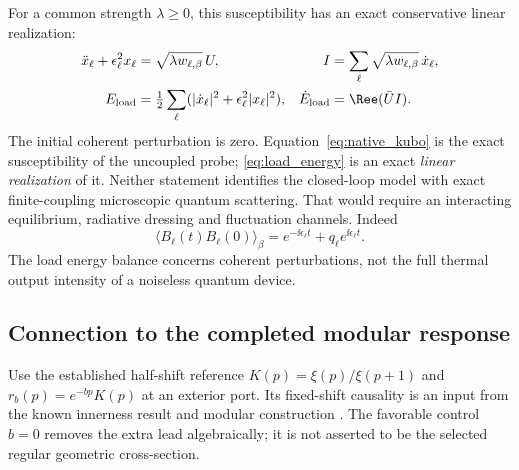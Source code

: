 For a common strength $\lambda\ge0$, this susceptibility has an exact
conservative linear realization:
\begin{align}
 \ddot x_\ell+\epsilon_\ell^2x_\ell
 &=\sqrt{\lambda w_{\ell,\beta}}\,U,
 & I&=\sum_\ell\sqrt{\lambda w_{\ell,\beta}}\,\dot x_\ell,\\
 E_{\rm load}&=\tfrac12\sum_\ell
 (|\dot x_\ell|^2+\epsilon_\ell^2|x_\ell|^2),
 &\dot E_{\rm load}&=\Ree(\bar U I).
 \label{eq:load_energy}
\end{align}
The initial coherent perturbation is zero. Equation~\eqref{eq:native_kubo}
is the exact susceptibility of the uncoupled probe;
\eqref{eq:load_energy} is an exact \emph{linear realization} of it.
Neither statement identifies the closed-loop model with exact
finite-coupling microscopic quantum scattering. That would require
an interacting equilibrium, radiative dressing and fluctuation channels.
Indeed
\begin{equation}
 \langle B_\ell(t)B_\ell(0)\rangle_\beta
 =e^{-\ii\epsilon_\ell t}+q_\ell e^{\ii\epsilon_\ell t}.
\end{equation}
The load energy balance concerns coherent perturbations, not the full
thermal output intensity of a noiseless quantum device.

\subsection{Connection to the completed modular response}

Use the established half-shift reference
$K(p)=\xi(p)/\xi(p+1)$ and $r_b(p)=e^{-bp}K(p)$ at an exterior port.
Its fixed-shift causality is an input from the known innerness result
and modular construction \cite{Suzuki,ModularNote}. The favorable
control $b=0$ removes the extra lead algebraically; it is not asserted
to be the selected regular geometric cross-section.

